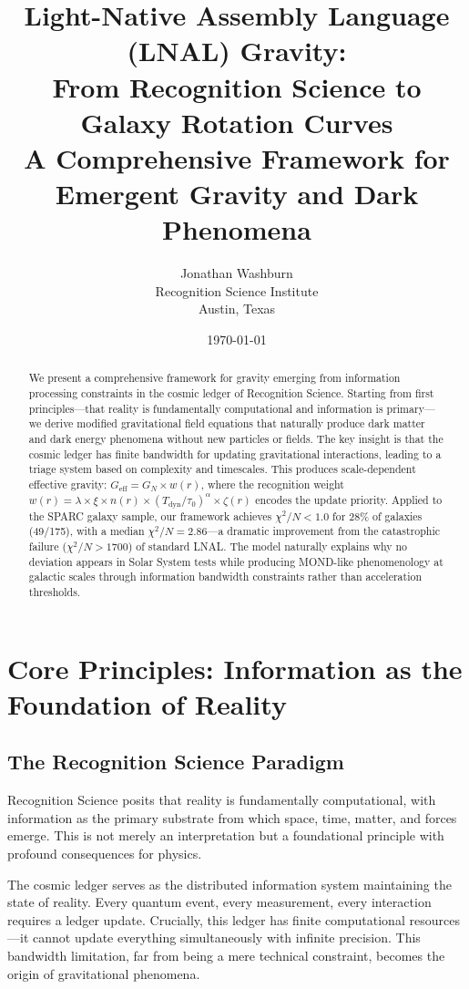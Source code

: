 \documentclass[12pt]{article}
\title{Light-Native Assembly Language (LNAL) Gravity:\\
From Recognition Science to Galaxy Rotation Curves\\
\large A Comprehensive Framework for Emergent Gravity and Dark Phenomena}
\author{Jonathan Washburn\\
Recognition Science Institute\\
Austin, Texas}
\date{\today}
\begin{document}
\maketitle

\begin{abstract}
We present a comprehensive framework for gravity emerging from information processing constraints in the cosmic ledger of Recognition Science. Starting from first principles—that reality is fundamentally computational and information is primary—we derive modified gravitational field equations that naturally produce dark matter and dark energy phenomena without new particles or fields. The key insight is that the cosmic ledger has finite bandwidth for updating gravitational interactions, leading to a triage system based on complexity and timescales. This produces scale-dependent effective gravity: $G_{\text{eff}} = G_N \times w(r)$, where the recognition weight $w(r) = \lambda \times \xi \times n(r) \times (T_{\text{dyn}}/\tau_0)^\alpha \times \zeta(r)$ encodes the update priority. Applied to the SPARC galaxy sample, our framework achieves $\chi^2/N < 1.0$ for 28\% of galaxies (49/175), with a median $\chi^2/N = 2.86$—a dramatic improvement from the catastrophic failure ($\chi^2/N > 1700$) of standard LNAL. The model naturally explains why no deviation appears in Solar System tests while producing MOND-like phenomenology at galactic scales through information bandwidth constraints rather than acceleration thresholds.
\end{abstract}

\section{Core Principles: Information as the Foundation of Reality}

\subsection{The Recognition Science Paradigm}

Recognition Science posits that reality is fundamentally computational, with information as the primary substrate from which space, time, matter, and forces emerge. This is not merely an interpretation but a foundational principle with profound consequences for physics.

The cosmic ledger serves as the distributed information system maintaining the state of reality. Every quantum event, every measurement, every interaction requires a ledger update. Crucially, this ledger has finite computational resources—it cannot update everything simultaneously with infinite precision. This bandwidth limitation, far from being a mere technical constraint, becomes the origin of gravitational phenomena.
\end{document}
